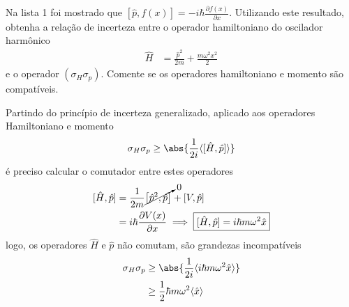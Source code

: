 	 \begin{prob}
		 Na lista 1 foi mostrado que $\displaystyle{\left[\hat{p}, f(x)\right]=-i \hbar \frac{\partial f(x)}{\partial x }}$. Utilizando este resultado, obtenha a relação de incerteza entre o operador hamiltoniano do oscilador harmônico
		 \begin{align}
			 \hat{H}&=\frac{\hat{p}^{2}}{2m}+\frac{m \omega^{2}x^{2}}{2}
		 \end{align}
		 e o operador $(\sigma_{H} \sigma_{p})$. Comente se os operadores hamiltoniano e momento são compatíveis.
		 \begin{sol}
		 		Partindo do princípio de incerteza generalizado, aplicado aos operadores Hamiltoniano e momento 
				\begin{align}
					\sigma_{H} \sigma_{p}\geq \abs{\frac{1}{2i}\langle [\hat{H},\hat{p}] \rangle}
				\end{align}
				é preciso calcular o comutador entre estes operadores
				\begin{align}
					\begin{split}
						[\hat{H},\hat{p}] &= \frac{1}{2m}\cancelto{0}{\left[\hat{p}^{2},\hat{p}\right]}+[V,\hat{p}]\\
															&= i \hbar \frac{\partial V(x)}{\partial x}\implies \boxed{[\hat{H},\hat{p}]=i \hbar m \omega^{2}\hat{x}}
					\end{split}
				\end{align}
				logo, os operadores $\hat{H}$ e $\hat{p}$ não comutam, são grandezas incompatíveis
				\begin{align}
					\begin{split}
						\sigma_{H} \sigma_{p} &\geq \abs{\frac{1}{2i} \langle i \hbar m \omega^{2} \hat{x} \rangle}\\
																	&\geq \frac{1}{2}\hbar m \omega^{2}\langle \hat{x} \rangle
					\end{split}
				\end{align}
		 \end{sol}
	 \end{prob}


